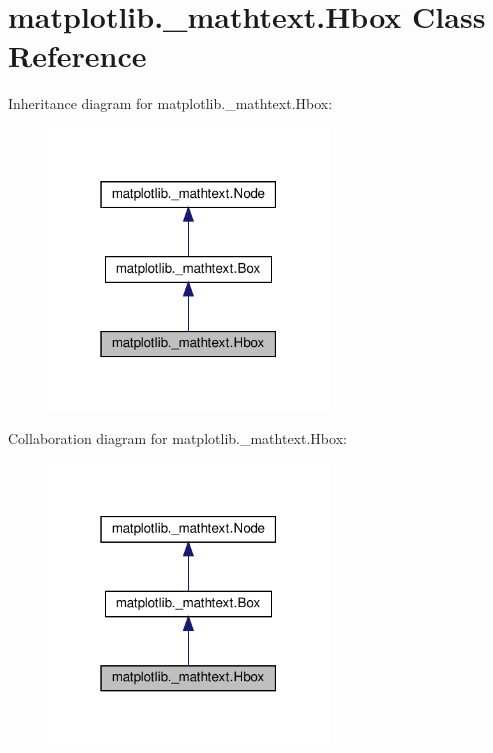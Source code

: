 \hypertarget{classmatplotlib_1_1__mathtext_1_1Hbox}{}\section{matplotlib.\+\_\+mathtext.\+Hbox Class Reference}
\label{classmatplotlib_1_1__mathtext_1_1Hbox}


Inheritance diagram for matplotlib.\+\_\+mathtext.\+Hbox\+:
\nopagebreak
\begin{figure}[H]
\begin{center}
\leavevmode
\includegraphics[width=211pt]{classmatplotlib_1_1__mathtext_1_1Hbox__inherit__graph}
\end{center}
\end{figure}


Collaboration diagram for matplotlib.\+\_\+mathtext.\+Hbox\+:
\nopagebreak
\begin{figure}[H]
\begin{center}
\leavevmode
\includegraphics[width=211pt]{classmatplotlib_1_1__mathtext_1_1Hbox__coll__graph}
\end{center}
\end{figure}
